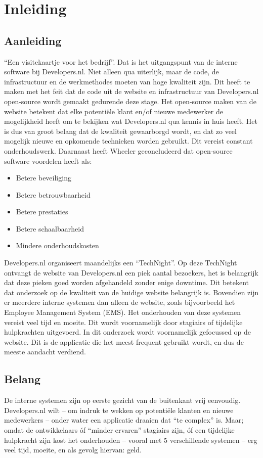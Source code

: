 \chapter{Inleiding}

\label{Chapter1}

\section{Aanleiding}
\enquote{Een visitekaartje voor het bedrijf}. Dat is het uitgangspunt van de interne software bij Developers.nl. Niet alleen qua uiterlijk, maar de code, de infrastructuur en de werkmethodes moeten van hoge kwaliteit zijn. Dit heeft te maken met het feit dat de code uit de website en infrastructuur van Developers.nl open-source wordt gemaakt gedurende deze stage. Het open-source maken van de website betekent dat elke potentiële klant en/of nieuwe medewerker de mogelijkheid heeft om te bekijken wat Developers.nl qua kennis in huis heeft. Het is dus van groot belang dat de kwaliteit gewaarborgd wordt, en dat zo veel mogelijk nieuwe en opkomende technieken worden gebruikt. Dit vereist constant onderhoudswerk. Daarnaast heeft Wheeler \parencite{WhyOpenSource} geconcludeerd dat open-source software voordelen heeft als:
\begin{itemize}
	\item Betere beveiliging
	\item Betere betrouwbaarheid 
	\item Betere prestaties
	\item Betere schaalbaarheid
	\item Mindere onderhoudskosten
\end{itemize}

Developers.nl organiseert maandelijks een \enquote{TechNight}. Op deze TechNight ontvangt de website van Developers.nl een piek aantal bezoekers, het is belangrijk dat deze pieken goed worden afgehandeld zonder enige downtime. Dit betekent dat onderzoek op de kwaliteit van de huidige website belangrijk is. Bovendien zijn er meerdere interne systemen dan alleen de website, zoals bijvoorbeeld het Employee Management System (EMS). Het onderhouden van deze systemen vereist veel tijd en moeite. Dit wordt voornamelijk door stagiairs of tijdelijke hulpkrachten uitgevoerd. In dit onderzoek wordt voornamelijk gefocussed op de website. Dit is de applicatie die het meest frequent gebruikt wordt, en dus de meeste aandacht verdiend.

\section{Belang}
De interne systemen zijn op eerste gezicht van de buitenkant vrij eenvoudig. Developers.nl wilt -- om indruk te wekken op potentiële klanten en nieuwe medewerkers -- onder water een applicatie draaien dat \enquote{te complex} is. Maar; omdat de ontwikkelaars óf \enquote{minder ervaren} stagiairs zijn, óf een tijdelijke hulpkracht zijn kost het onderhouden -- vooral met 5 verschillende systemen -- erg veel tijd, moeite, en als gevolg hiervan: geld.

